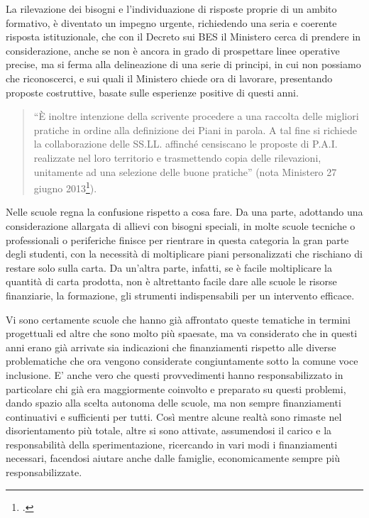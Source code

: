 La rilevazione dei bisogni e l'individuazione di risposte proprie di un ambito formativo, è diventato un impegno urgente, richiedendo una seria e coerente risposta istituzionale, che con il Decreto sui BES il Ministero cerca di prendere in considerazione, anche se non è ancora in grado di prospettare linee operative precise, ma si ferma alla delineazione di una serie di principi, in cui non possiamo che riconoscerci, e sui quali il Ministero chiede ora di lavorare, presentando proposte costruttive, basate sulle esperienze positive di questi anni.
\begin{quote}
“È inoltre intenzione della scrivente procedere a una raccolta delle migliori pratiche in ordine alla definizione dei Piani in parola. A tal fine si richiede la collaborazione delle SS.LL. affinché censiscano le proposte di P.A.I. realizzate nel loro territorio e trasmettendo copia delle rilevazioni, unitamente ad una selezione delle buone pratiche” (nota Ministero 27 giugno 2013\footcite{Nota_1551_2013}).
\end{quote}
Nelle scuole regna la confusione rispetto a cosa fare. Da una parte, adottando una considerazione allargata di allievi con bisogni speciali, in molte scuole tecniche o professionali o periferiche finisce per rientrare in questa categoria la gran parte degli studenti, con la necessità di moltiplicare piani personalizzati che rischiano di restare solo sulla carta. Da un'altra parte, infatti, se è facile moltiplicare la quantità di carta prodotta, non è altrettanto facile dare alle scuole le risorse finanziarie, la formazione, gli strumenti indispensabili per un intervento efficace.

Vi sono certamente scuole che hanno già affrontato queste tematiche in termini progettuali ed altre che sono molto più spaesate, ma va considerato che in questi anni erano già arrivate sia indicazioni che finanziamenti rispetto alle diverse problematiche che ora vengono considerate congiuntamente sotto la comune voce inclusione. E' anche vero che questi provvedimenti hanno responsabilizzato in particolare chi già era maggiormente coinvolto e preparato su questi problemi, dando spazio alla scelta autonoma delle scuole, ma non sempre finanziamenti continuativi e sufficienti per tutti. Così mentre alcune realtà sono rimaste nel disorientamento più totale, altre si sono attivate, assumendosi il carico e la responsabilità della sperimentazione, ricercando in vari modi i finanziamenti necessari, facendosi aiutare anche dalle famiglie, economicamente sempre più responsabilizzate.

